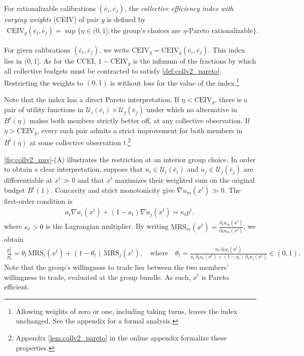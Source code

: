 \documentclass[11 pt]{article}
\begin{document}
\begin{definition}\label{def:collv2_indices}\normalfont
For rationalizable calibrations $(\bar e_{i}, \bar e_{j})$, the \emph{collective efficiency index with varying weights} (CEIV) of pair $g$ is defined by
\begin{align*}
\mathrm{CEIV}_{g}(\bar e_{i}, \bar e_{j}) = \sup\bigl\{ \eta \in (0,1] : \text{the group's choices are } \eta\text{-Pareto rationalizable} \bigr\}.
\end{align*}
\end{definition}

For given calibrations $(\bar e_i,\bar e_j)$, we write $\mathrm{CEIV}_g=\mathrm{CEIV}_g(\bar e_i,\bar e_j)$. This index lies in $(0,1]$. As for the CCEI, $1-\mathrm{CEIV}_g$ is the infimum of the fractions by which all collective budgets must be contracted to satisfy \autoref{def:collv2_pareto}. Restricting the weights to $(0,1)$ is without loss for the value of the index.\footnote{Allowing weights of zero or one, including taking turns, leaves the index unchanged. See the appendix for a formal analysis.}

Note that the index has a direct Pareto interpretation. If $\eta<\mathrm{CEIV}_g$, there is a pair of utility functions in $\mathcal U_i(\bar e_i)\times\mathcal U_j(\bar e_j)$ under which no alternative in $B^t(\eta)$ makes both members strictly better off, at any collective observation. If $\eta>\mathrm{CEIV}_g$, every such pair admits a strict improvement for both members in $B^t(\eta)$ at some collective observation $t$.\footnote{Appendix \autoref{lem:collv2_pareto} in the online appendix formalize these properties.}

\autoref{fig:collv2_mrs}-(A) illustrates the restriction at an interior group choice. In order to obtain a clear interpretation, suppose that $u_i\in\mathcal U_i(\bar e_i)$ and $u_j\in\mathcal U_j(\bar e_j)$ are differentiable at $x^t\gg0$ and that $x^t$ maximizes their weighted sum on the original budget $B^t(1)$. Concavity and strict monotonicity give $\nabla u_m(x^t)\gg0$. The first-order condition is
\begin{align*}
a_t\nabla u_i(x^t)+(1-a_t)\nabla u_j(x^t)=\kappa_t p^t,
\end{align*}
where $\kappa_t>0$ is the Lagrangian multiplier. By writing $\mathrm{MRS}_m(x^t)= \frac{\partial_r u_m(x^t)}{\partial_b u_m(x^t)}$, we obtain
\begin{align*}
\frac{p_r^t}{p_b^t}
=\theta_t\,\mathrm{MRS}_i(x^t)+(1-\theta_t)\,\mathrm{MRS}_j(x^t), \quad \text{where} \quad
\theta_t = \frac{a_t\,\partial_b u_i(x^t)}{a_t\,\partial_b u_i(x^t)+(1-a_t)\,\partial_b u_j(x^t)}\in(0,1).
\end{align*}
Note that the group's willingness to trade lies between the two members' willingness to trade, evaluated at the group bundle. As such, $x^t$ is Pareto efficient.
\end{document}
